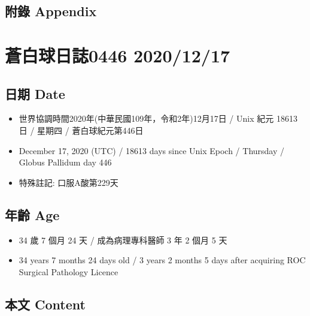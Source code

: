 \documentclass[
]{article}
\providecommand{\tightlist}{%
  \setlength{\itemsep}{0pt}\setlength{\parskip}{0pt}}
\begin{document}
\hypertarget{ux9644ux9304-appendix-15}{%
\subsection{附錄 Appendix}\label{ux9644ux9304-appendix-15}}

\hypertarget{ux84bcux767dux7403ux65e5ux8a8c0446-20201217}{%
\section{蒼白球日誌0446
2020/12/17}\label{ux84bcux767dux7403ux65e5ux8a8c0446-20201217}}

\hypertarget{ux65e5ux671f-date-16}{%
\subsection{日期 Date}\label{ux65e5ux671f-date-16}}

\begin{itemize}
\tightlist
\item
  世界協調時間2020年(中華民國109年，令和2年)12月17日 / Unix 紀元 18613
  日 / 星期四 / 蒼白球紀元第446日
\item
  December 17, 2020 (UTC) / 18613 days since Unix Epoch / Thursday /
  Globus Pallidum day 446
\item
  特殊註記: 口服A酸第229天
\end{itemize}

\hypertarget{ux5e74ux9f61-age-16}{%
\subsection{年齡 Age}\label{ux5e74ux9f61-age-16}}

\begin{itemize}
\tightlist
\item
  34 歲 7 個月 24 天 / 成為病理專科醫師 3 年 2 個月 5 天
\item
  34 years 7 months 24 days old / 3 years 2 months 5 days after
  acquiring ROC Surgical Pathology Licence
\end{itemize}

\hypertarget{ux672cux6587-content-16}{%
\subsection{本文 Content}\label{ux672cux6587-content-16}}
\end{document}
